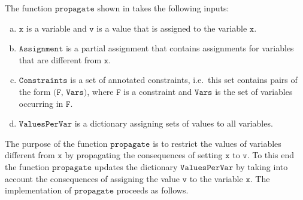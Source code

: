 \noindent
The function $\texttt{propagate}$ shown in  takes the following inputs:
\begin{enumerate}[(a)]
\item $\texttt{x}$ is a variable and $\texttt{v}$ is a value that is assigned to the variable $\texttt{x}$.
\item $\texttt{Assignment}$ is a partial assignment that contains assignments for variables that are
      different from $\texttt{x}$.
\item $\texttt{Constraints}$ is a set of annotated constraints, i.e.~this set contains pairs of the form 
      $\texttt{(F, Vars)}$, where $\texttt{F}$ is a constraint and $\texttt{Vars}$ is the set of
      variables occurring in $\texttt{F}$.
\item $\texttt{ValuesPerVar}$ is a dictionary assigning sets of values to all variables.
\end{enumerate}
The purpose of the function  $\texttt{propagate}$ is to restrict the values of variables different from
$\texttt{x}$  by propagating the consequences of setting $\texttt{x}$ to $\texttt{v}$.  To this end
the function $\texttt{propagate}$ updates the dictionary $\texttt{ValuesPerVar}$ by taking into account the
consequences of assigning the value $\texttt{v}$ to the variable $\texttt{x}$.  The implementation of
$\texttt{propagate}$ proceeds as follows.
